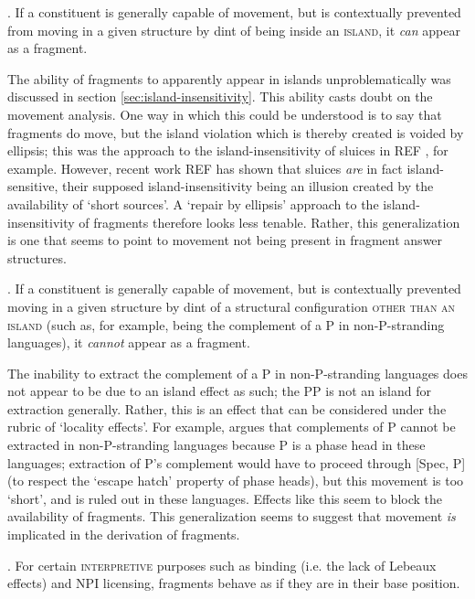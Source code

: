 \documentclass[11pt,letterpaper]{article}
\begin{document}
\ex. 	If a constituent is generally capable of movement, but is contextually prevented from moving in a given structure by dint of being inside an \textsc{island}, it \emph{can} appear as a fragment.

The ability of fragments to apparently appear in islands unproblematically was discussed in section \ref{sec:island-insensitivity}.
This ability casts doubt on the movement analysis. 
One way in which this could be understood is to say that fragments do move, but the island violation which is thereby created is voided by ellipsis; this was the approach to the island-insensitivity of sluices in REF %
, for example.
However, recent work REF %
has shown that sluices \emph{are} in fact island-sensitive, their supposed island-insensitivity being an illusion created by the availability of `short sources'.
A `repair by ellipsis' approach to the island-insensitivity of fragments therefore looks less tenable.
Rather, this generalization is one that seems to point to movement not being present in fragment answer structures.

\ex. 	If a constituent is generally capable of movement, but is contextually prevented moving in a given structure by dint of a structural configuration \textsc{other than an island} (such as, for example, being the complement of a P in non-P-stranding languages), it \emph{cannot} appear as a fragment.

The inability to extract the complement of a P in non-P-stranding languages does not appear to be due to an island effect as such; the PP is not an island for extraction generally.%
Rather, this is an effect that can be considered under the rubric of `locality effects'.
For example, \cite{Ab03} argues that complements of P cannot be extracted in non-P-stranding languages because P is a phase head in these languages; extraction of P's complement would have to proceed through [Spec, P] (to respect the `escape hatch' property of phase heads), but this movement is too `short', and is ruled out in these languages.
Effects like this seem to block the availability of fragments. 
This generalization seems to suggest that movement \emph{is} implicated in the derivation of fragments.

\ex.	For certain \textsc{interpretive} purposes such as binding (i.e. the lack of Lebeaux effects) and NPI licensing, fragments behave as if they are in their base position.
\end{document}
